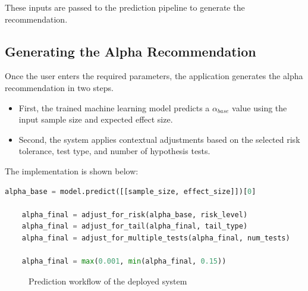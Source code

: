 These inputs are passed to the prediction pipeline to generate the recommendation.


\subsection{Generating the Alpha Recommendation}

Once the user enters the required parameters, the application generates the alpha recommendation in two steps.
\begin{itemize}
\item First, the trained machine learning model predicts a $\alpha_{base}$ value using the input sample size and expected effect size.

\item Second, the system applies contextual adjustments based on the selected risk tolerance, test type, and number of hypothesis tests.
\end{itemize}

The implementation is shown below:

\begin{lstlisting}[language=Python]
	alpha_base = model.predict([[sample_size, effect_size]])[0]
	
	alpha_final = adjust_for_risk(alpha_base, risk_level)
	alpha_final = adjust_for_tail(alpha_final, tail_type)
	alpha_final = adjust_for_multiple_tests(alpha_final, num_tests)
	
	alpha_final = max(0.001, min(alpha_final, 0.15))
\end{lstlisting}

\begin{figure}[h]
	\centering
	\caption{Prediction workflow of the deployed system}
	\label{fig:prediction_workflow}
\end{figure}

